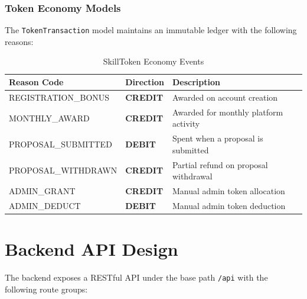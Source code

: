 \subsubsection{Token Economy Models}

The \texttt{TokenTransaction} model maintains an immutable ledger with the following
reasons:

\begin{table}[h!]
\centering
\caption{SkillToken Economy Events}
\label{tab:token_events}
\renewcommand{\arraystretch}{1.4}
\begin{tabular}{|>{\ttfamily\footnotesize}p{4cm}|p{1.5cm}|p{7cm}|}
\hline
\rowcolor{sblight}
\textbf{Reason Code} & \textbf{Direction} & \textbf{Description} \\ \hline
REGISTRATION\_BONUS  & \textcolor{sbaccent}{\bfseries CREDIT} & Awarded on account creation \\ \hline
MONTHLY\_AWARD       & \textcolor{sbaccent}{\bfseries CREDIT} & Awarded for monthly platform activity \\ \hline
PROPOSAL\_SUBMITTED  & \textcolor{sborange}{\bfseries DEBIT}  & Spent when a proposal is submitted \\ \hline
PROPOSAL\_WITHDRAWN  & \textcolor{sbaccent}{\bfseries CREDIT} & Partial refund on proposal withdrawal \\ \hline
ADMIN\_GRANT         & \textcolor{sbaccent}{\bfseries CREDIT} & Manual admin token allocation \\ \hline
ADMIN\_DEDUCT        & \textcolor{sborange}{\bfseries DEBIT}  & Manual admin token deduction \\ \hline
\end{tabular}
\end{table}

\section{Backend API Design}
\label{sec:api}

The backend exposes a RESTful API under the base path \texttt{/api} with the following
route groups:


